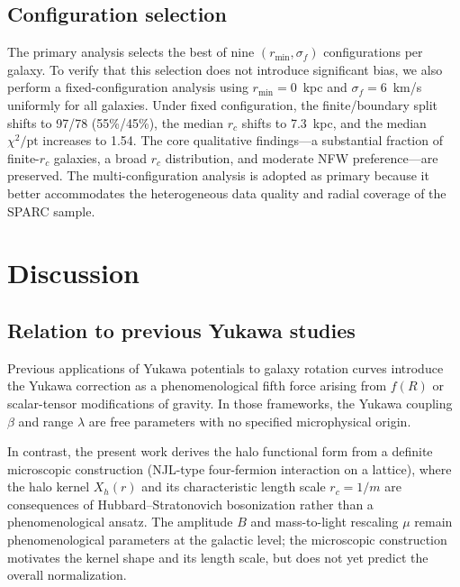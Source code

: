\documentclass[11pt,a4paper]{article}
\begin{document}
\subsection{Configuration selection}

The primary analysis selects the best of nine
$(r_{\min}, \sigma_f)$ configurations per galaxy.
To verify that this selection does not introduce significant
bias, we also perform a fixed-configuration analysis using
$r_{\min} = 0$~kpc and $\sigma_f = 6$~km/s uniformly for all
galaxies.
Under fixed configuration, the finite/boundary split shifts to
97/78 (55\%/45\%), the median $r_c$ shifts to 7.3~kpc, and the
median $\chi^2/\mathrm{pt}$ increases to 1.54.
The core qualitative findings---a substantial fraction of
finite-$r_c$ galaxies, a broad $r_c$ distribution, and
moderate NFW preference---are preserved.
The multi-configuration analysis is adopted as primary because
it better accommodates the heterogeneous data quality and radial
coverage of the SPARC sample.


\section{Discussion}
\label{sec:discuss}

\subsection{Relation to previous Yukawa studies}

Previous applications of Yukawa potentials to galaxy rotation
curves \cite{deAlmeida:2018kwq,Henrichs:2021bnd,Hassan:2025yuk}
introduce the Yukawa correction as a phenomenological fifth force
arising from $f(R)$ or scalar-tensor modifications of gravity.
In those frameworks, the Yukawa coupling $\beta$ and range $\lambda$
are free parameters with no specified microphysical origin.

In contrast, the present work derives the halo functional form
from a definite microscopic construction (NJL-type four-fermion
interaction on a lattice), where the halo kernel $X_h(r)$ and its
characteristic length scale $r_c = 1/m$ are consequences of
Hubbard--Stratonovich bosonization rather than a phenomenological
ansatz.
The amplitude $B$ and mass-to-light rescaling $\mu$ remain
phenomenological parameters at the galactic level; the microscopic
construction motivates the kernel shape and its length scale, but
does not yet predict the overall normalization.
\end{document}
